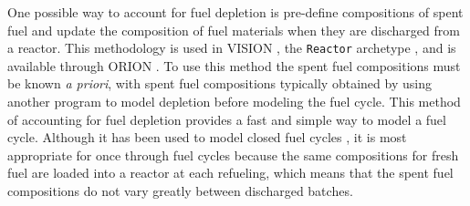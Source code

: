 One possible way to account for fuel depletion is pre-define  
compositions of spent fuel and update the composition of fuel 
materials when 
they are discharged from a reactor. This methodology is used 
in VISION \cite{yacout_vision_2006}, the \Cycamore \texttt{Reactor} 
archetype \Cyclus \cite{carlsen_cycamore_2014},
and is available through ORION \cite{sunny_transition_2015}. To 
use this method the 
spent fuel compositions must be known \textit{a priori}, with spent fuel 
compositions typically obtained by using another program 
to model depletion before modeling the fuel cycle. 
This method of accounting for fuel depletion provides a fast and 
simple way to model a fuel cycle. Although it has been used to 
model closed fuel cycles \cite{bae_standardized_2019,djokic_application_2015},
it is most appropriate for once through fuel cycles 
\cite{sunny_transition_2015} because the same 
compositions for fresh fuel are loaded into a reactor at each 
refueling, which means that the spent fuel compositions do not vary 
greatly between discharged batches. 

